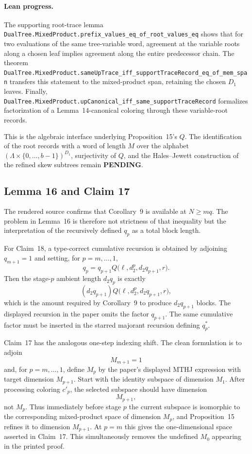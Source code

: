 \documentclass[11pt]{article}
\newcommand{\todo}{\textcolor{gray!70!black}{\textbf{PENDING}}}
\newcommand{\lean}[1]{\texttt{#1}}
\begin{document}
\paragraph{Lean progress.}
The supporting root-trace lemma
\lean{DualTree.MixedProduct.prefix_values_eq_of_root_values_eq}
shows that for two evaluations of the same tree-variable word, agreement at
the variable roots along a chosen leaf implies agreement along the entire
predecessor chain.  The theorem
\lean{DualTree.MixedProduct.sameUpTrace_iff_supportTraceRecord_eq_of_mem_span}
transfers this statement to the mixed-product span, retaining the chosen
$D_1$ leaves.  Finally,
\lean{DualTree.MixedProduct.upCanonical_iff_same_supportTraceRecord}
formalizes factorization of a Lemma~14-canonical coloring through these
variable-root records.

This is the algebraic interface underlying Proposition~15's $Q$.
The identification of the root records with a word of length $M$ over the
alphabet $(\Lambda\times\{0,\ldots,b-1\})^{D_1}$, surjectivity of $Q$,
and the Hales--Jewett construction of the refined skew subtrees remain
\todo.

\subsection{Lemma 16 and Claim 17}
The rendered source confirms that Corollary~9 is available at
$N\ge mq$.  The problem in Lemma~16 is therefore not strictness of that
inequality but the interpretation of the recursively defined $q_p$ as a total
block length.

For Claim~18, a type-correct cumulative recursion is obtained by adjoining
$q_{m+1}=1$ and setting, for $p=m,\ldots,1$,
\[
q_p
  =q_{p+1}
    Q\bigl(\ell,d_2^p,d_2q_{p+1},r\bigr).
\]
Then the stage-$p$ ambient length $d_2q_p$ is exactly
\[
(d_2q_{p+1})
Q\bigl(\ell,d_2^p,d_2q_{p+1},r\bigr),
\]
which is the amount required by Corollary~9 to produce
$d_2q_{p+1}$ blocks.  The displayed recursion in the paper omits the factor
$q_{p+1}$.  The same cumulative factor must be inserted in the starred
majorant recursion defining $q_p^*$.

Claim~17 has the analogous one-step indexing shift.  The clean formulation is
to adjoin
\[
M_{m+1}=1
\]
and, for $p=m,\ldots,1$, define $M_p$ by the paper's displayed MTHJ expression
with target dimension $M_{p+1}$.  Start with the identity subspace of
dimension $M_1$.  After processing coloring $c'_p$, the selected subspace
should have dimension
\[
M_{p+1},
\]
not $M_p$.  Thus immediately before stage $p$ the current subspace is
isomorphic to the corresponding mixed-product space of dimension $M_p$, and
Proposition~15 refines it to dimension $M_{p+1}$.  At $p=m$ this gives the
one-dimensional space asserted in Claim~17.  This simultaneously removes the
undefined $M_0$ appearing in the printed proof.
\end{document}
